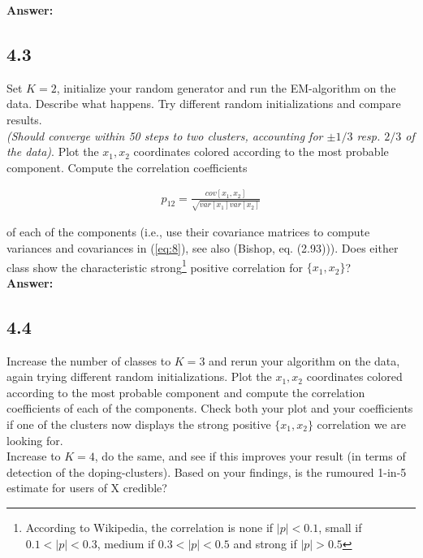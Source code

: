 \documentclass[a4paper]{article}
\begin{document}
\textbf{Answer:}\\






\subsection*{4.3}

Set $K = 2$, initialize your random generator and run the EM-algorithm on the data. Describe what happens. Try different random initializations and compare results.\\
\textit{(Should converge within 50 steps to two clusters, accounting for $\pm 1/3$ resp. $2/3$ of the data)}. Plot the $x_1, x_2$ coordinates colored according to the most probable component. Compute the correlation coefficients 

\begin{eqnarray} \label{eq:8}
p_{12} = \frac{cov[x_1, x_2]}{\sqrt{var[x_1] var[x_2]}}
\end{eqnarray}

of each of the components (i.e., use their covariance matrices to compute variances and covariances in (\ref{eq:8}), see also (Bishop, eq. (2.93))). Does either class show the characteristic strong\footnote{According to Wikipedia, the correlation is none if $|p| < 0.1$, small if $0.1 < |p| < 0.3$, medium if $0.3 < |p| < 0.5$ and strong if $|p| > 0.5$} positive correlation for $\{ x_1, x_2\}$?\\


\textbf{Answer:}\\







\subsection*{4.4}

Increase the number of classes to $K = 3$ and rerun your algorithm on the data, again trying different random initializations. Plot the $x_1, x_2$ coordinates colored according to the most probable component and compute the correlation coefficients of each of the components. Check both your plot and your coefficients if one of the clusters now displays the strong positive $\{ x_1, x_2\}$ correlation we are looking for.\\
Increase to $K = 4$, do the same, and see if this improves your result (in terms of detection of the doping-clusters). Based on your findings, is the rumoured 1-in-5 estimate for users of X credible?\\
\end{document}
